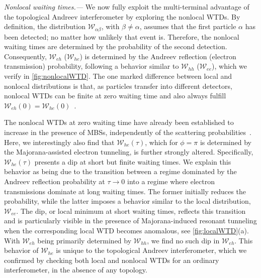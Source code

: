 \documentclass[aps,prl,amsmath,twocolumn,floatfix,superscriptaddress,longbibliography,footinbib]{revtex4-1}
\begin{document}
\textit{Nonlocal waiting times.---} 
We now fully exploit the multi-terminal advantage of the topological Andreev interferometer by exploring the nonlocal WTDs. By definition, the distribution $\mathcal{W}_{\alpha\beta}$, with $\beta\neq\alpha$, assumes that the first particle $\alpha$ has been detected; no matter how unlikely that event is. Therefore, the nonlocal waiting times are determined by the probability of the second detection. Consequently, $\mathcal{W}_{eh}$ ($\mathcal{W}_{he}$) is determined by the Andreev reflection (electron transmission) probability, following a behavior similar to $\mathcal{W}_{hh}$ ($\mathcal{W}_{ee}$), which we verify in \cref{fig:nonlocalWTD}. The one marked difference between local and nonlocal distributions is that, as particles transfer into different detectors, nonlocal WTDs can be finite at zero waiting time and also always fulfill $\mathcal{W}_{eh}(0)=\mathcal{W}_{he}(0)$~\cite{Mi2018}. 

The nonlocal WTDs at zero waiting time have already been established to increase in the presence of MBSs, independently of the scattering probabilities~\cite{Mi2018}. Here, we interestingly also find that $\mathcal{W}_{he}(\tau)$, which for $\phi=\pi$ is determined by the Majorana-assisted electron tunneling, is further strongly altered. Specifically, $\mathcal{W}_{he}(\tau)$ presents a dip at short but finite waiting times. We explain this behavior as being due to the transition between a regime dominated by the Andreev reflection probability at $\tau\rightarrow0$ into a regime where electron transmissions dominate at long waiting times. The former initially reduces the probability, while the latter imposes a behavior similar to the local distribution, $\mathcal{W}_{ee}$. The dip, or local minimum at short waiting times, reflects this transition and is particularly visible in the presence of Majorana-induced resonant tunneling when the corresponding local WTD becomes anomalous, see \cref{fig:localWTD}(a). With $\mathcal{W}_{eh}$ being primarily determined by $\mathcal{W}_{hh}$, we find no such dip in $\mathcal{W}_{eh}$. This behavior of $\mathcal{W}_{he}$ is unique to the topological Andreev interferometer, which we confirmed by checking both local and nonlocal WTDs for an ordinary interferometer, in the absence of any topology. 
\end{document}
